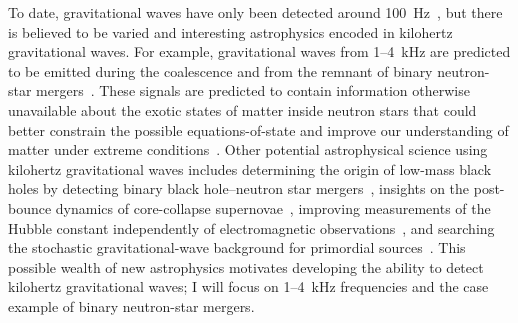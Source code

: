To date, gravitational waves have only been detected around 100~Hz~\cite{GWTC-1:2018,GWTC-2:2020}, but there is believed to be varied and interesting astrophysics encoded in kilohertz gravitational waves.
For example, gravitational waves from 1--4~kHz are predicted to be emitted during the coalescence and from the remnant of binary neutron-star mergers~\cite{PhysRevD.100.104029}.
These signals are predicted to contain information otherwise unavailable about the exotic states of matter inside neutron stars that could better constrain the possible equations-of-state and improve our understanding of matter under extreme conditions~\cite{PhysRevD.100.104029,miaoDesignGravitationalWaveDetectors2018}. %
Other potential astrophysical science using kilohertz gravitational waves includes determining the origin of low-mass black holes by detecting binary black hole--neutron star mergers~\cite{PhysRevD.79.044030}, insights on the post-bounce dynamics of core-collapse supernovae~\cite{Ott_2009}, improving measurements of the Hubble constant independently of electromagnetic observations~\cite{PhysRevX.4.041004}, and searching the stochastic gravitational-wave background for primordial sources~\cite{miaoDesignGravitationalWaveDetectors2018}.
This possible wealth of new astrophysics motivates developing the ability to detect kilohertz gravitational waves; I will focus on 1--4~kHz frequencies and the case example of binary neutron-star mergers.



